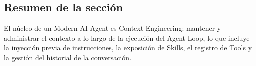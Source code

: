 \subsection{Resumen de la sección}

El núcleo de un Modern AI Agent es Context Engineering: mantener y administrar el contexto a lo largo de la ejecución del Agent Loop, lo que incluye la inyección previa de instrucciones, la exposición de Skills, el registro de Tools y la gestión del historial de la conversación.

